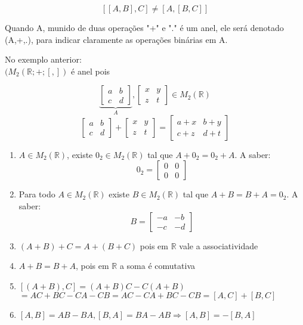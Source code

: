 \[[[A,B],C]\neq [A,[B,C]]\]

Quando A, munido de duas opera{\c c}{\~o}es "+" e "." {\'e} um anel, ele ser{\'a} denotado (A,+,.), para indicar claramente as opera{\c c}{\~o}es bin{\'a}rias em A.

No exemplo anterior:\\
$(M_{2}(\mathbb{R};+;[,])$ {\'e} anel pois

\[\underbrace{\left[\begin{array}{cc}
a & b\\
c & d
\end{array}\right]}_{A},\left[\begin{array}{cc}
x & y\\
z & t
\end{array}\right]\in M_{2}(\mathbb{R})\]
\[\left[\begin{array}{cc}
a & b\\
c & d
\end{array}\right]+\left[\begin{array}{cc}
x & y\\
z & t
\end{array}\right]=\left[\begin{array}{cc}
a+x & b+y\\
c+z & d+t
\end{array}\right]\]
\begin{enumerate}
\item $A\in M_{2}(\mathbb{R})$, existe $0_{2}\in M_{2}(\mathbb{R})$ tal que $A+0_{2}=0_{2}+A$. A saber:\\
\[0_{2}=\left[\begin{array}{cc}
0 & 0\\
0 & 0
\end{array}\right]\]
\item Para todo $A\in M_{2}(\mathbb{R})$ existe $B\in M_{2}(\mathbb{R})$ tal que $A+B=B+A=0_{2}$. A saber:\\
\[B=\left[\begin{array}{cc}
-a & -b\\
-c & -d
\end{array}\right]\]
\item $(A+B)+C=A+(B+C)$ pois em $\mathbb{R}$ vale a associatividade
\item $A+B=B+A$, pois em $\mathbb{R}$ a soma {\'e} comutativa
\item $[(A+B),C]=(A+B)C-C(A+B)$\\
$=AC+BC-CA-CB=AC-CA+BC-CB=[A,C]+[B,C]$
\item $[A,B]=AB-BA, [B,A]=BA-AB \Rightarrow [A,B]=-[B,A]$
\end{enumerate}

